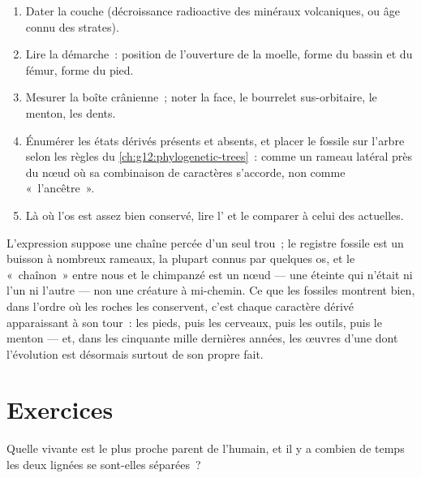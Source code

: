 \begin{method}\label{met:g12:human-evolution:placing}
\begin{enumerate}
  \item Dater la couche (décroissance radioactive des minéraux
        volcaniques, ou âge connu des strates).
  \item Lire la démarche~: position de l'ouverture de la moelle, forme
        du bassin et du fémur, forme du pied.
  \item Mesurer la boîte crânienne~; noter la face, le bourrelet
        sus-orbitaire, le menton, les dents.
  \item Énumérer les états dérivés présents et absents, et placer le
        fossile sur l'arbre selon les règles du
        \cref{ch:g12:phylogenetic-trees}~: comme un rameau latéral
        près du nœud où sa combinaison de caractères s'accorde, non
        comme «~l'ancêtre~».
  \item Là où l'os est assez bien conservé, lire l' et le comparer
        à celui des  actuelles.
\end{enumerate}
\end{method}

\begin{remark}\label{rem:g12:human-evolution:link}
L'expression suppose une chaîne percée d'un seul trou~; le registre
fossile est un buisson à nombreux rameaux, la plupart connus par
quelques os, et le «~chaînon~» entre nous et le chimpanzé est un
nœud --- une  éteinte qui n'était ni l'un ni l'autre --- non
une créature à mi-chemin. Ce que les fossiles montrent bien, dans
l'ordre où les roches les conservent, c'est chaque caractère dérivé
apparaissant à son tour~: les pieds, puis les cerveaux, puis les
outils, puis le menton --- et, dans les cinquante mille dernières
années, les œuvres d'une  dont l'évolution est désormais surtout
de son propre fait.
\end{remark}

\section{Exercices}

\begin{exercise}[$\star$]\label{exo:g12:human-evolution:1}
Quelle  vivante est le plus proche parent de l'humain, et il y a
combien de temps les deux lignées se sont-elles séparées~?
\end{exercise}

